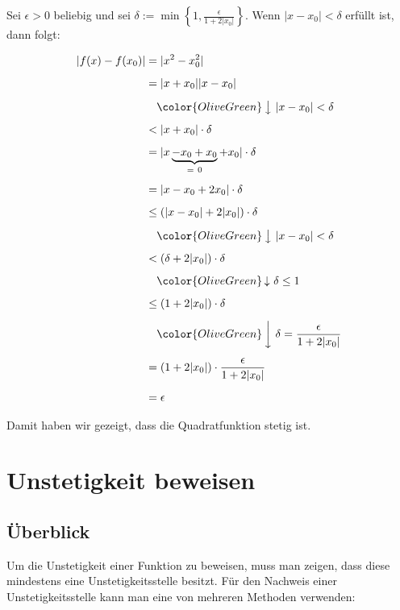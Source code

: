 \documentclass[fontsize=9pt,
               parskip=half-,
               DIV=14,
               listof=chapterentry,
               tocflat]{scrbook}
\begin{document}
\begin{proof*}
Sei $\epsilon >0$ beliebig und sei $\delta :=\min \left\{1,{\tfrac {\epsilon }{1+2|x_{0}|}}\right\}$. Wenn $\left|x-x_{0}\right|<\delta $ erfüllt ist, dann folgt:

\begin{align*}
|f(x)-f(x_{0})|&=|x^{2}-x_{0}^{2}|\\[0.5em]&=|x+x_{0}||x-x_{0}|\\[0.5em]&\quad {\color {OliveGreen}\left\downarrow \ |x-x_{0}|<\delta \right.}\\[0.5em]&<|x+x_{0}|\cdot \delta \\[0.5em]&=|x\underbrace {-x_{0}+x_{0}} _{=\ 0}+x_{0}|\cdot \delta \\[0.5em]&=|x-x_{0}+2x_{0}|\cdot \delta \\[0.5em]&\leq (|x-x_{0}|+2|x_{0}|)\cdot \delta \\[0.5em]&\quad {\color {OliveGreen}\left\downarrow \ |x-x_{0}|<\delta \right.}\\[0.5em]&<(\delta +2|x_{0}|)\cdot \delta \\[0.5em]&\quad {\color {OliveGreen}\left\downarrow \ \delta \leq 1\right.}\\[0.5em]&\leq (1+2|x_{0}|)\cdot \delta \\[0.5em]&\quad {\color {OliveGreen}\left\downarrow \ \delta ={\frac {\epsilon }{1+2|x_{0}|}}\right.}\\[0.5em]&=(1+2|x_{0}|)\cdot {\frac {\epsilon }{1+2|x_{0}|}}\\[0.5em]&=\epsilon 
\end{align*}

Damit haben wir gezeigt, dass die Quadratfunktion stetig ist.

\end{proof*}

\chapter{Unstetigkeit beweisen}

\section{Überblick}

Um die Unstetigkeit einer Funktion zu beweisen, muss man zeigen, dass diese mindestens eine Unstetigkeitsstelle besitzt. Für den Nachweis einer Unstetigkeitsstelle kann man eine von mehreren Methoden verwenden:
\end{document}
